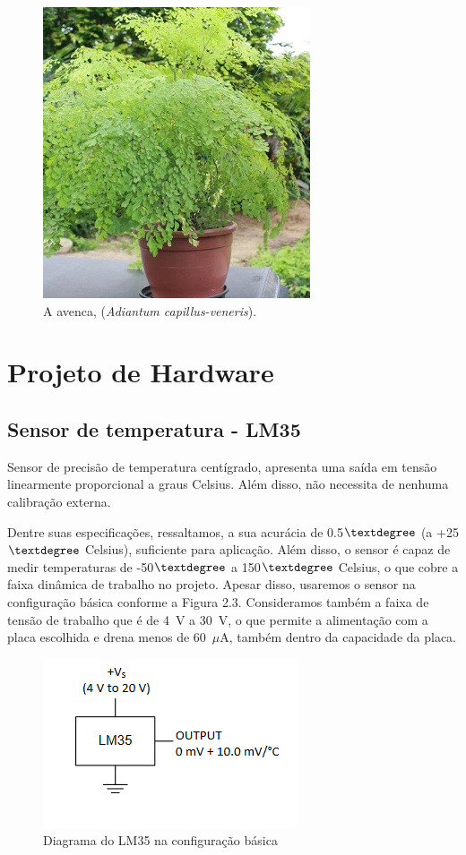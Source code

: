 \documentclass[a4paper,12pt]{report}
\begin{document}
	 
\begin{figure}[!h]
	\centering
	\includegraphics[width=0.4\linewidth]{figs/avenca}
	\caption{A avenca, (\textit{Adiantum capillus-veneris}).}
	\label{fig:avenca}
\end{figure}
	
	\section{Projeto de Hardware}
	
		\subsection{Sensor de temperatura - LM35}
		
		Sensor de precisão de temperatura centígrado, apresenta uma saída em tensão linearmente proporcional a graus Celsius. Além disso, não necessita de nenhuma calibração externa.
		
		Dentre suas especificações, ressaltamos, a sua acurácia de 0.5$\textdegree$ (a +25$\textdegree$ Celsius), suficiente para aplicação. Além disso, o sensor é capaz de medir temperaturas de -50$\textdegree$ a 150$\textdegree$ Celsius, o que cobre a faixa dinâmica de trabalho no projeto. Apesar disso, usaremos o sensor na configuração básica conforme a Figura 2.3. Consideramos também a faixa de tensão de trabalho que é de 4~V a 30~V, o que permite a alimentação com a placa escolhida e drena menos de 60~$\mu$A, também dentro da capacidade da placa.
		\begin{figure}[!htb]
			\centering
			\includegraphics{LM35_config_basica}
			\caption{Diagrama do LM35 na configuração básica}
			\label{Rotulo}
		\end{figure}
\end{document}
